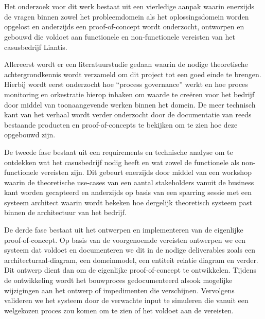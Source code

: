 
\chapter{}%
\label{ch:onderzoeksmethode}

Het onderzoek voor dit werk bestaat uit een vierledige aanpak waarin enerzijds de vragen binnen zowel het probleemdomein als het oplossingsdomein worden opgelost en anderzijds een proof-of-concept wordt onderzocht, ontworpen en gebouwd die voldoet aan functionele en non-functionele vereisten van het casusbedrijf Liantis. \newline

Allereerst wordt er een literatuurstudie gedaan waarin de nodige theoretische achtergrondkennis wordt verzameld om dit project tot een goed einde te brengen. Hierbij wordt eerst onderzocht hoe “process governance” werkt en hoe proces monitoring en orkestratie hierop inhaken om waarde te creëren voor het bedrijf door middel van toonaangevende werken binnen het domein. De meer technisch kant van het verhaal wordt verder onderzocht door de documentatie van reeds bestaande producten en proof-of-concepts te bekijken om te zien hoe deze opgebouwd zijn.\newline

De tweede fase bestaat uit een requirements en technische analyse om te ontdekken wat het casusbedrijf nodig heeft en wat zowel de functionele als non-functionele vereisten zijn. Dit gebeurt enerzijds door middel van een workshop waarin de theoretische use-cases van een aantal stakeholders vanuit de business kant worden gecapteerd en anderzijds op basis van een sparring sessie met een systeem architect waarin wordt bekeken hoe dergelijk theoretisch systeem past binnen de architectuur van het bedrijf.\newline

De derde fase bestaat uit het ontwerpen en implementeren van de eigenlijke proof-of-concept. Op basis van de voorgenoemde vereisten ontwerpen we een systeem dat voldoet en documenteren we dit in de nodige deliverables zoals een architecturaal-diagram, een domeinmodel, een entiteit relatie diagram en verder. Dit ontwerp dient dan om de eigenlijke proof-of-concept te ontwikkelen. Tijdens de ontwikkeling wordt het bouwproces gedocumenteerd alsook mogelijke wijzigingen aan het ontwerp of impedimenten die verschijnen. Vervolgens valideren we het systeem door de verwachte input te simuleren die vanuit een welgekozen proces zou komen om te zien of het voldoet aan de vereisten. \newline

